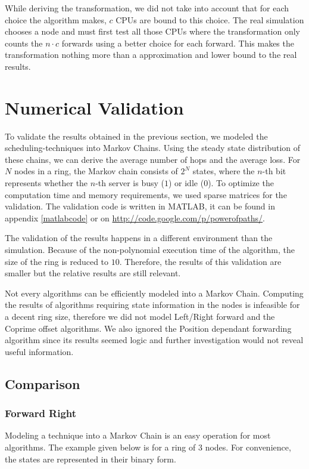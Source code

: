 \documentclass[10pt,a4paper]{article}
\begin{document}
While deriving the transformation, we did not take into account that for each choice the algorithm makes, $c$ CPUs are bound to this choice. The real simulation chooses a node and must first test all those CPUs where the transformation only counts the $n \cdot c$ forwards using a better choice for each forward. This makes the transformation nothing more than a approximation and lower bound to the real results.


\section{Numerical Validation}
\label{secvalidation}

To validate the results obtained in the previous section, we modeled the scheduling-techniques into Markov Chains. Using the steady state distribution of these chains, we can derive the average number of hops and the average loss.
For $N$ nodes in a ring, the Markov chain consists of $2^N$ states, where the $n$-th bit represents whether the $n$-th server is busy ($1$) or idle ($0$). To optimize the computation time and memory requirements, we used sparse matrices for the validation. The validation code is written in MATLAB, it can be found in appendix \ref{matlabcode} or on \url{http://code.google.com/p/powerofpaths/}.

The validation of the results happens in a different environment than the simulation. Because of the non-polynomial execution time of the algorithm, the size of the ring is reduced to $10$. Therefore, the results of this validation are smaller but the relative results are still relevant.

Not every algorithms can be efficiently modeled into a Markov Chain. Computing the results of algorithms requiring state information in the nodes is infeasible for a decent ring size, therefore we did not model Left/Right forward and the Coprime offset algorithms. We also ignored the Position dependant forwarding algorithm since its results seemed logic and further investigation would not reveal useful information.

\subsection{Comparison}
\subsubsection*{Forward Right}
Modeling a technique into a Markov Chain is an easy operation for most algorithms. The example given below is for a ring of 3 nodes. For convenience, the states are represented in their binary form.
\end{document}
